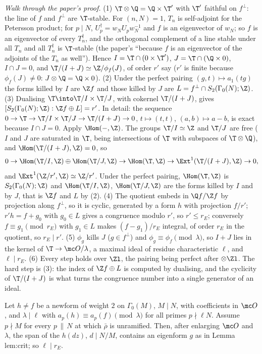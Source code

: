 \begin{sloppypar}
\emph{Walk through the paper's proof.} (1) $\T\otimes\Q=\Q\times\T'$ with $\T'$ faithful on $f^\perp$: the line of $f$ and $f^\perp$ are $\T$-stable. For $(n,N)=1$, $T_n$ is self-adjoint
for the Petersson product; for $p\mid N$, $U_p^\dagger=w_NU_pw_N^{-1}$ and $f$ is an eigenvector of $w_N$; so $f$ is an eigenvector of every $T_n^\dagger$, and the orthogonal
complement of a line stable under all $T_n$ and all $T_n^\dagger$ is $\T$-stable (the paper's ``because $f$ is an eigenvector of the adjoints of the $T_n$ as well''). Hence
$I=\T\cap(0\times\T')$, $J=\T\cap(\Q\times0)$, $I\cap J=0$, and $\T/(I+J)\simeq\Z/\phi_f(J)$, of order $r'$ say ($r'$ is finite because $\phi_f(J)\ne0$: $J\otimes\Q=\Q\times0$). (2) Under the perfect
pairing $(g,t)\mapsto a_1(tg)$ the forms killed by $I$ are $\Z f$ and those killed by $J$ are $L=f^\perp\cap S_2(\Gamma_0(N);\Z)$. (3) Dualising $\T\into\T/I\times\T/J$, with cokernel
$\T/(I+J)$, gives $[S_2(\Gamma_0(N);\Z):\Z f\oplus L]=r'$. In detail: the sequence $0\to\T\to\T/I\times\T/J\to\T/(I+J)\to0$, $t\mapsto(t,t)$, $(a,b)\mapsto a-b$, is exact because $I\cap J=0$.
Apply $\Hom(-,\Z)$. The groups $\T/I\simeq\Z$ and $\T/J$ are free ($I$ and $J$ are saturated in $\T$, being intersections of $\T$ with subspaces of $\T\otimes\Q$), and $\Hom(\T/(I+J),\Z)=0$, so
\[
0\to\Hom(\T/I,\Z)\oplus\Hom(\T/J,\Z)\to\Hom(\T,\Z)\to\Ext^1(\T/(I+J),\Z)\to0,
\]
and $\Ext^1(\Z/r',\Z)\simeq\Z/r'$. Under the perfect pairing, $\Hom(\T,\Z)$ is $S_2(\Gamma_0(N);\Z)$ and $\Hom(\T/I,\Z)$, $\Hom(\T/J,\Z)$ are the forms killed by $I$ and by $J$, that is $\Z f$ and $L$ by (2). (4) The quotient embeds in $\Q f/\Z f$ by projection along $f^\perp$, so it is cyclic, generated by a form $h$ with projection
$f/r'$; $r'h=f+g_0$ with $g_0\in L$ gives a congruence modulo $r'$, so $r'\le r_E$; conversely $f\equiv g_1\pmod{r_E}$ with $g_1\in L$ makes $(f-g_1)/r_E$ integral, of order $r_E$ in the
quotient, so $r_E\mid r'$. (5) $\phi_g$ kills $J$ ($g\in f^\perp$) and $\phi_g\equiv\phi_f\pmod\lambda$, so $I+J$ lies in the kernel of $\T\to\mc O/\lambda$, a maximal ideal of residue characteristic
$\ell$, and $\ell\mid r_E$. (6) Every step holds over $\Zl$, the pairing being perfect after $\otimes\Zl$. The hard step is (3): the index of $\Z f\oplus L$ is computed by dualising,
and the cyclicity of $\T/(I+J)$ is what turns the congruence number into a single generator of an ideal.

\begin{lemma}\label{lem:paper:old}
Let $h\ne f$ be a newform of weight $2$ on $\Gamma_0(M)$, $M\mid N$, with coefficients in $\mc O$, and $\lambda\mid\ell$ with $a_p(h)\equiv a_p(f)\pmod\lambda$ for all primes $p\nmid\ell N$. Assume $p\nmid M$
for every $p\,\|\,N$ at which $\bar\rho$ is unramified. Then, after enlarging $\mc O$ and $\lambda$, the span of the $h(dz)$, $d\mid N/M$, contains an eigenform $g$ as in Lemma lem:crit; so
$\ell\mid r_E$.
\end{lemma}


\end{sloppypar}

